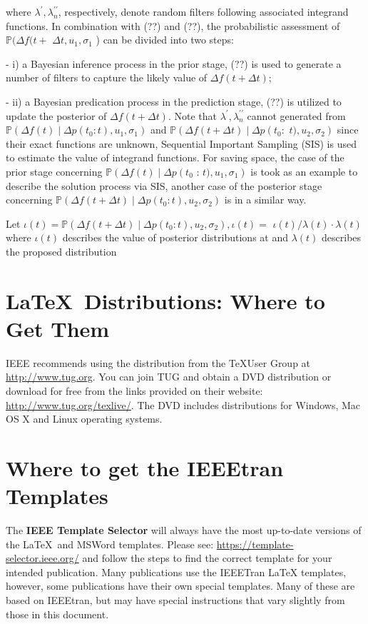 \documentclass[lettersize,journal]{IEEEtran}
\begin{document}
where $\lambda^{\prime}, \lambda_{n}^{\prime \prime}$, respectively, denote random filters following associated integrand functions. In combination with (??) and (??), the probabilistic assessment of $\mathbb{P}(\Delta f(t+$ $\Delta t, u_{1}, \sigma_{1}$ ) can be divided into two steps:

- i) a Bayesian inference process in the prior stage, (??) is used to generate a number of filters to capture the likely value of $\Delta f(t+\Delta t)$;

- ii) a Bayesian predication process in the prediction stage, (??) is utilized to update the posterior of $\Delta f(t+\Delta t)$. Note that $\lambda^{\prime}, \lambda_{n}^{\prime \prime}$ cannot generated from $\mathbb{P}\left(\Delta f(t) \mid \Delta p\left(t_{0}: t\right), u_{1}, \sigma_{1}\right)$ and $\mathbb{P}\left(\Delta f(t+\Delta t) \mid \Delta p\left(t_{0}:\right.\right.$ $\left.t), u_{2}, \sigma_{2}\right)$ since their exact functions are unknown, Sequential Important Sampling (SIS) is used to estimate the value of integrand functions. For saving space, the case of the prior stage concerning $\mathbb{P}\left(\Delta f(t) \mid \Delta p\left(t_{0}\right.\right.$ : $\left.t), u_{1}, \sigma_{1}\right)$ is took as an example to describe the solution process via SIS, another case of the posterior stage concerning $\mathbb{P}\left(\Delta f(t+\Delta t) \mid \Delta p\left(t_{0}: t\right), u_{2}, \sigma_{2}\right)$ is in a similar way.

Let $\iota(t)=\mathbb{P}\left(\Delta f(t+\Delta t) \mid \Delta p\left(t_{0}: t\right), u_{2}, \sigma_{2}\right), \iota(t)=$ $\iota(t) / \lambda(t) \cdot \lambda(t)$ where $\iota(t)$ describes the value of posterior distributions at and $\lambda(t)$ describes the proposed distribution

\section{\LaTeX \ Distributions: Where to Get Them}
\noindent IEEE recommends using the distribution from the \TeX User Group at \url{http://www.tug.org}. You can join TUG and obtain a DVD distribution or download for free  from the links provided on their website: \url{http://www.tug.org/texlive/}. The DVD includes distributions for Windows, Mac OS X and Linux operating systems.

\section{Where to get the IEEEtran Templates}
\noindent The {\bf{IEEE Template Selector}} will always have the most up-to-date versions of the \LaTeX\ and MSWord templates. Please see: \url{https://template-selector.ieee.org/} and follow the steps to find the correct template for your intended publication. Many publications use the IEEETran LaTeX templates, however, some publications have their own special templates. Many of these are  based on IEEEtran, but may have special instructions that vary slightly from those in this document.
\end{document}
